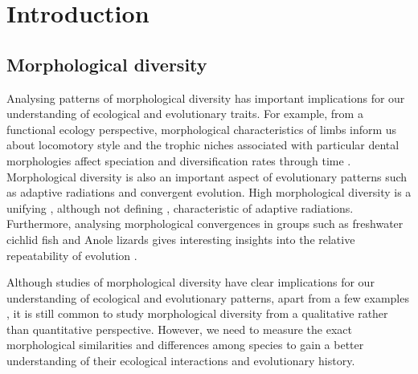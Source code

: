 \chapter{Introduction}
\label{chap:introduction}





\noindent

\section{Morphological diversity}

	Analysing patterns of morphological diversity has important implications for our understanding of ecological and evolutionary traits. For example, from a functional ecology perspective, morphological characteristics of limbs inform us about locomotory style \citep[e.g.][]{Bou1987} and the trophic niches associated with particular dental morphologies affect speciation and diversification rates through time \citep{Price2012}. Morphological diversity is also an important aspect of evolutionary patterns such as adaptive radiations and convergent evolution. High morphological diversity is a unifying \citep{Losos2010a, Olson2009}, although not defining \citep{Glor2010, Olson2009}, characteristic of adaptive radiations. Furthermore, analysing morphological convergences in groups such as freshwater cichlid fish \citep{Muschick2012} and Anole lizards \citep{Mahler2013} gives interesting insights into the relative repeatability of evolution \citep{Losos2011}.


	Although studies of morphological diversity have clear implications for our understanding of ecological and evolutionary patterns, apart from a few examples \citep[e.g.][]{Ruta2013, Goswami2011, Brusatte2008}, it is still common to study morphological diversity from a qualitative rather than quantitative perspective. However, we need to measure the exact morphological similarities and differences among species to gain a better understanding of their ecological interactions and evolutionary history.


